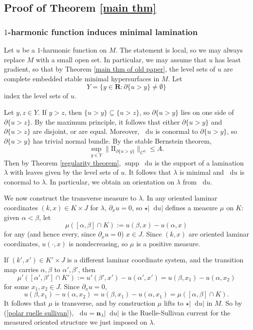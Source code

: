 \documentclass[reqno,11pt]{amsart}
\newcommand{\RR}{\mathbf{R}}
\newcommand*\dif{\mathop{}\!\mathrm{d}}
\DeclareMathOperator{\supp}{supp}
\newcommand{\Two}{\mathrm{I\!I}}
\newcommand{\normal}{\mathbf n}
\theoremstyle{definition}
\numberwithin{equation}{section}
\begin{document}
\subsection{Proof of Theorem \texorpdfstring{\ref{main thm}}{C}}
\subsubsection{\texorpdfstring{$1$-harmonic}{One-harmonic} function induces minimal lamination}
Let $u$ be a $1$-harmonic function on $M$.
The statement is local, so we may always replace $M$ with a small open set.
In particular, we may assume that $u$ has least gradient, so that by Theorem \ref{main thm of old paper}, the level sets of $u$ are complete embedded stable minimal hypersurfaces in $M$.
Let
$$Y = \{y \in \RR: \partial \{u > y\} \neq \emptyset\}$$
index the level sets of $u$.

Let $y, z \in Y$. If $y > z$, then $\{u > y\} \subseteq \{u > z\}$, so $\partial \{u > y\}$ lies on one side of $\partial \{u > z\}$.
By the maximum principle, it follows that either $\partial \{u > y\}$ and $\partial \{u > z\}$ are disjoint, or are equal.
Moreover, $\dif u$ is conormal to $\partial \{u > y\}$, so $\partial \{u > y\}$ has trivial normal bundle.
By the stable Bernstein theorem,
\begin{equation}\label{curvature estimate on 1 harmonic}
	\sup_{y \in Y} \|\Two_{\partial \{u > y\}}\|_{C^0} \leq A.
\end{equation}
Then by Theorem \ref{regularity theorem}, $\supp \dif u$ is the support of a lamination $\lambda$ with leaves given by the level sets of $u$.
It follows that $\lambda$ is minimal and $\dif u$ is conormal to $\lambda$.
In particular, we obtain an orientation on $\lambda$ from $\dif u$.

We now construct the transverse measure to $\lambda$.
In any oriented laminar coordinates $(k, x) \in K \times J$ for $\lambda$, $\partial_x u = 0$, so $\star |\dif u|$ defines a measure $\mu$ on $K$: given $\alpha < \beta$, let
$$\mu([\alpha, \beta] \cap K) := u(\beta, x) - u(\alpha, x)$$
for any (and hence every, since $\partial_x u = 0$) $x \in J$.
Since $(k, x)$ are oriented laminar coordinates, $u(\cdot, x)$ is nondecreasing, so $\mu$ is a positive measure.

If $(k', x') \in K' \times J$ is a different laminar coordinate system, and the transition map carries $\alpha, \beta$ to $\alpha', \beta'$, then
$$\mu'([\alpha', \beta'] \cap K') := u'(\beta', x') - u(\alpha', x') = u(\beta, x_1) - u(\alpha, x_2)$$
for some $x_1, x_2 \in J$. Since $\partial_x u = 0$,
$$u(\beta, x_1) - u(\alpha, x_2) = u(\beta, x_1) - u(\alpha, x_1) = \mu([\alpha, \beta] \cap K).$$
It follows that $\mu$ is transverse, and by construction $\mu$ lifts to $\star |\dif u|$ in $M$.
So by (\ref{polar ruelle sullivan}), $\dif u = \normal_\lambda |\dif u|$ is the Ruelle-Sullivan current for the measured oriented structure we just imposed on $\lambda$.
\end{document}
